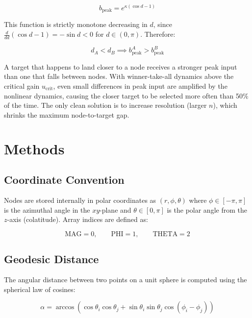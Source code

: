 \documentclass[12pt, letterpaper]{article}
\begin{document}
\begin{equation}
    b_{\text{peak}} = e^{\kappa(\cos d - 1)}
\end{equation}

This function is strictly monotone decreasing in $d$, since $\frac{d}{dd}(\cos d - 1) = -\sin d < 0$ for $d \in (0, \pi)$. Therefore:

\begin{equation}
    d_A < d_B \implies b_{\text{peak}}^A > b_{\text{peak}}^B
\end{equation}

A target that happens to land closer to a node receives a stronger peak input than one that falls between nodes. With winner-take-all dynamics above the critical gain $u_{\text{crit}}$, even small differences in peak input are amplified by the nonlinear dynamics, causing the closer target to be selected more often than 50\% of the time. The only clean solution is to increase resolution (larger $n$), which shrinks the maximum node-to-target gap.

\section{Methods}

\subsection{Coordinate Convention}

Nodes are stored internally in polar coordinates as $(r, \phi, \theta)$ where $\phi \in [-\pi, \pi]$ is the azimuthal angle in the $xy$-plane and $\theta \in [0, \pi]$ is the polar angle from the $z$-axis (colatitude). Array indices are defined as:

\begin{equation}
    \text{MAG} = 0, \qquad \text{PHI} = 1, \qquad \text{THETA} = 2
\end{equation}

\subsection{Geodesic Distance}

The angular distance between two points on a unit sphere is computed using the spherical law of cosines:

\begin{equation}
    \alpha = \arccos\left(\cos\theta_i \cos\theta_j + \sin\theta_i \sin\theta_j \cos(\phi_i - \phi_j)\right)
\end{equation}
\end{document}
